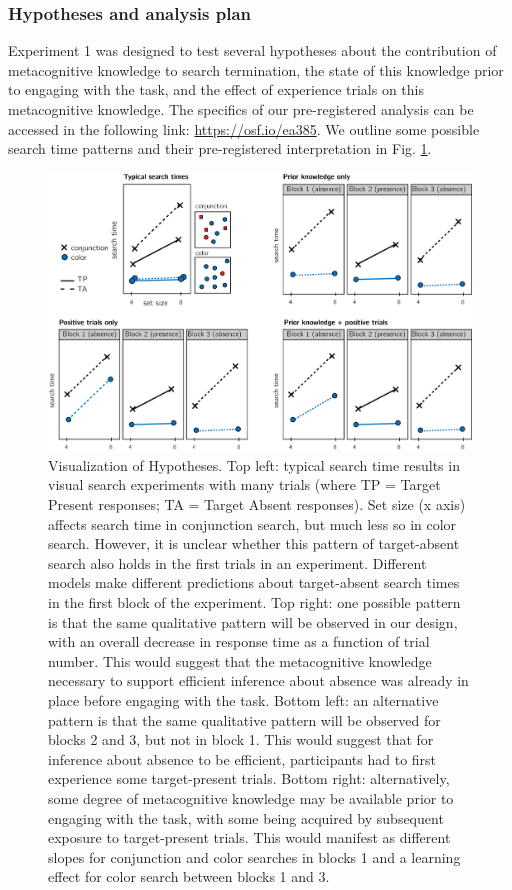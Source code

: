 \documentclass[
  english,
  man]{apa6}
\begin{document}
\hypertarget{hypotheses-and-analysis-plan}{%
\subsubsection{Hypotheses and analysis plan}\label{hypotheses-and-analysis-plan}}

Experiment 1 was designed to test several hypotheses about the contribution of metacognitive knowledge to search termination, the state of this knowledge prior to engaging with the task, and the effect of experience trials on this metacognitive knowledge. The specifics of our pre-registered analysis can be accessed in the following link: \url{https://osf.io/ea385}. We outline some possible search time patterns and their pre-registered interpretation in Fig. \ref{fig:models}.

\begin{figure}
\includegraphics[width=\textwidth]{figures/models} \caption{Visualization of Hypotheses. Top left: typical search time results in visual search experiments with many trials (where TP =  Target Present responses; TA = Target Absent responses). Set size (x axis) affects search time in conjunction search, but much less so in color search. However, it is unclear whether this pattern of target-absent search also holds in the first trials in an experiment. Different models make different predictions about target-absent search times in the first block of the experiment. Top right: one possible pattern is that the same qualitative pattern will be observed in our design, with an overall decrease in response time as a function of trial number. This would suggest that the metacognitive knowledge necessary to support efficient inference about absence was already in place before engaging with the task. Bottom left: an alternative pattern is that the same qualitative pattern will be observed for blocks 2 and 3, but not in block 1. This would suggest that for inference about absence to be efficient, participants had to first experience some target-present trials. Bottom right: alternatively, some degree of metacognitive knowledge may be available prior to engaging with the task, with some being acquired by subsequent exposure to target-present trials. This would manifest as different slopes for conjunction and color searches in blocks 1 and a learning effect for color search between blocks 1 and 3.}\label{fig:models}
\end{figure}
\end{document}
